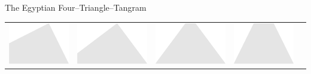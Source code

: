 \documentclass[14pt]{beamer}
\begin{document}
\begin{frame}{The Egyptian Four--Triangle--Tangram}
\begin{center}
\begin{tabular}{llrcc}
                \includegraphics[scale=0.25]{figures/figure023h.pdf} &
                \includegraphics[scale=0.25]{figures/figure023i.pdf} &
                \includegraphics[scale=0.25]{figures/figure023e.pdf} &
                \includegraphics[scale=0.25]{figures/figure023d.pdf} \\[2ex]

\end{tabular}
\end{center}
\end{frame}
\end{document}
